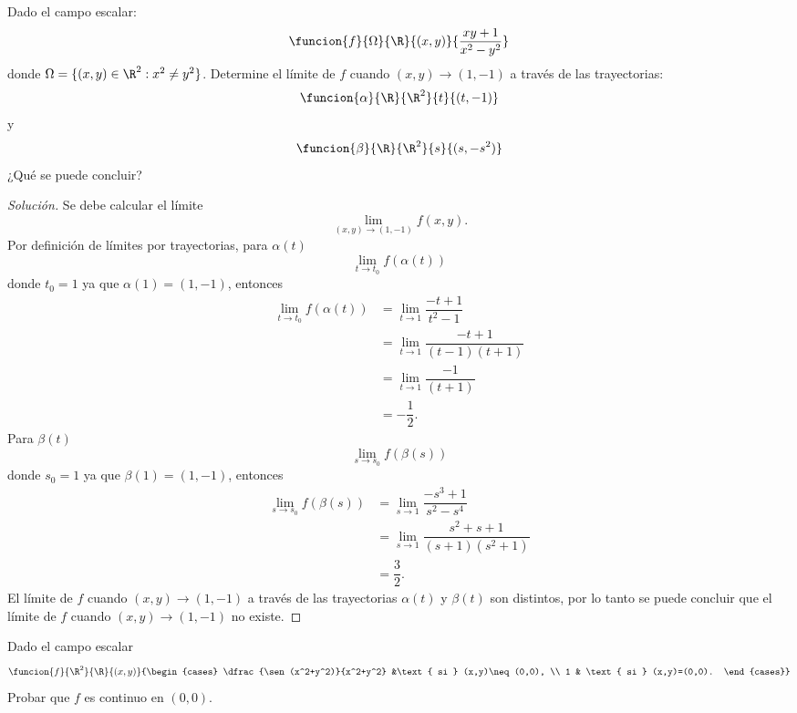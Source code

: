 \documentclass[a4,11pt]{aleph-notas}
\begin{document}
\encabezado

\begin{ejer}
Dado el campo escalar:
    \[
        \funcion{f}{\Omega}{\R}{(x,y)}{\dfrac{xy+1}{x^2-y^2}}
    \]
    donde $\Omega=\lbrace (x,y)\in\R^2:x^2\neq y^2 \rbrace$.
    Determine el límite de $f$ cuando $(x,y) \to (1,-1)$ a través de las trayectorias:
    \[
        \funcion{\alpha}{\R}{\R^2}{t}{(t,-1)}
    \]
    y 
    \[
        \funcion{\beta}{\R}{\R^2}{s}{(s,-s^2)}
    \]
    ¿Qué se puede concluir?
\end{ejer}

\begin{proof}[Solución]
Se debe calcular el límite
    \[
        \lim_{(x,y)\to (1,-1)} f(x,y).
    \]
    Por definición de límites por trayectorias, para $\alpha(t)$
    \[
        \lim_{t\to t_0} f(\alpha(t))
    \]
    donde $t_0=1$ ya que $\alpha(1)=(1,-1)$, entonces
    \[
    \begin{aligned}
        \lim_{t\to t_0} f(\alpha(t))&=\lim_{t\to 1} \dfrac{-t+1}{t^2-1}\\
        &=\lim_{t\to 1} \dfrac{-t+1}{(t-1)(t+1)}\\
        &=\lim_{t\to 1} \dfrac{-1}{(t+1)}\\
        &=-\dfrac{1}{2}.
    \end{aligned}
    \]
    Para $\beta(t)$
    \[
        \lim_{s\to s_0} f(\beta(s))
    \]
    donde $s_0=1$ ya que $\beta(1)=(1,-1)$, entonces 
    \[
    \begin{aligned}
        \lim_{s\to s_0} f(\beta(s))&=\lim_{s\to 1} \dfrac{-s^3+1}{s^2-s^4}\\
        &=\lim_{s\to 1} \dfrac{s^2+s+1}{(s+1)(s^2+1)}\\
        &=\dfrac{3}{2}.
    \end{aligned}
    \]
El límite de $f$ cuando $(x,y) \rightarrow (1,-1)$ a través de las trayectorias $\alpha(t)$ y $\beta(t)$ son distintos, por lo tanto se puede concluir que el límite de $f$ cuando $(x,y) \to (1,-1)$ no existe.
\end{proof}

\begin{ejer}
Dado el campo escalar
    \[
    	\funcion{f}{\R^2}{\R}{(x,y)}%
            	{\begin{cases}
            		\dfrac{\sen(x^2+y^2)}{x^2+y^2} &\text{ si }   (x,y)\neq(0,0), \\
             		1 &  \text{ si }  (x,y)=(0,0).
                 \end{cases}}
    \]
	Probar que $f$ es continuo en $(0,0)$.
\end{ejer}
\end{document}
